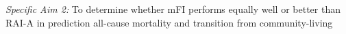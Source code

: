 \emph{Specific Aim 2:} To determine whether mFI performs equally well or better than RAI-A in prediction all-cause mortality and transition from community-living